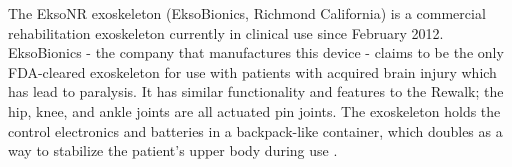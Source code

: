 The EksoNR exoskeleton (EksoBionics, Richmond California) is a commercial rehabilitation exoskeleton currently in clinical use since February 2012. EksoBionics - the company that manufactures this device - claims to be the only FDA-cleared exoskeleton for use with patients with acquired brain injury which has lead to paralysis. It has similar functionality and features to the Rewalk; the hip, knee, and ankle joints are all actuated pin joints. The exoskeleton holds the control electronics and batteries in a backpack-like container, which doubles as a way to stabilize the patient's upper body during use \cite{ExoEksoNR}.



